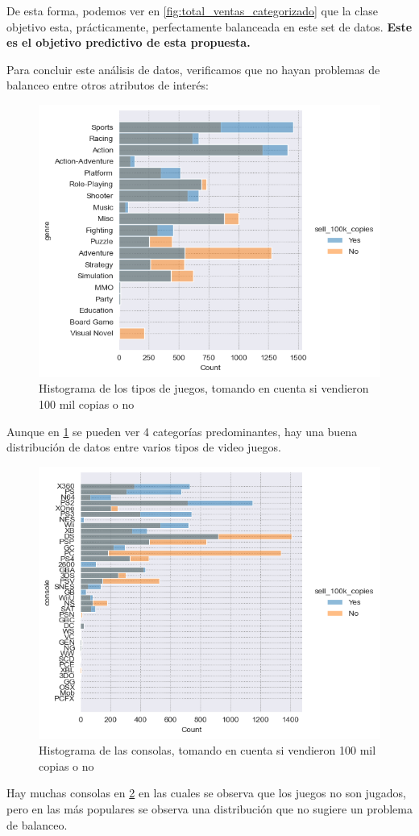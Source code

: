 \documentclass[a4paper]{article}
\begin{document}
    De esta forma, podemos ver en \ref{fig:total_ventas_categorizado} que la clase objetivo esta, prácticamente, perfectamente balanceada en este set de datos. \textbf{Este es el objetivo predictivo de esta propuesta.}
    
    Para concluir este análisis de datos, verificamos que no hayan problemas de balanceo entre otros atributos de interés:\newpage

    \begin{figure}[hbtp!]
        \centering
        \includegraphics[width=0.5\linewidth]{Module_4_BigData//Proyecto//Propuestas//Imagenes/dataset2_genre_histogram.png}
        \caption{Histograma de los tipos de juegos, tomando en cuenta si vendieron 100 mil copias o no}
        \label{fig:hist_genre}
    \end{figure}

    Aunque en \ref{fig:hist_genre} se pueden ver 4 categorías predominantes, hay una buena distribución de datos entre varios tipos de video juegos.

    \begin{figure}[hbtp!]
        \centering
        \includegraphics[width=0.5\linewidth]{Module_4_BigData//Proyecto//Propuestas//Imagenes/dataset2_consolas_histogram.png}
        \caption{Histograma de las consolas, tomando en cuenta si vendieron 100 mil copias o no}
        \label{fig:hist_consoles}
    \end{figure}

    Hay muchas consolas en \ref{fig:hist_consoles} en las cuales se observa que los juegos no son jugados, pero en las más populares se observa una distribución que no sugiere un problema de balanceo.
\end{document}

